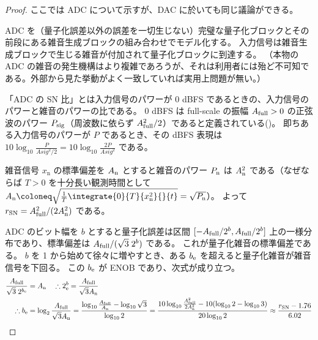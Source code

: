         \begin{proof}
            \quad\par
            ここでは ADC について示すが、DAC に於いても同じ議論ができる。\par
            ADC を（量子化誤差以外の誤差を一切生じない）完璧な量子化ブロックとその前段にある雑音生成ブロックの組み合わせでモデル化する。
            入力信号は雑音生成ブロックで生じる雑音が付加されて量子化ブロックに到達する。
            （本物の ADC の雑音の発生機構はより複雑であろうが、それは利用者には殆ど不可知である。外部から見た挙動がよく一致していれば実用上問題が無い。）
            \par
            「ADC の SN 比」とは入力信号のパワーが 0 dBFS であるときの、入力信号のパワーと雑音のパワーの比である。
            0 dBFS は full-scale の振幅 $A_\text{full}>0$ の正弦波のパワー $P_\text{sig}$（周波数に依らず $A_\text{full}^2/2$）であると定義されている(\cite{dBFS})。
            即ちある入力信号のパワーが $P$ であるとき、その dBFS 表現は $10\log_{10} \frac{P}{Asig^2/2} = 10\log_{10} \frac{2P}{Asig^2}$ である。
            \par
            雑音信号 $x_\text{n}$ の標準偏差を $A_\text{n}$ とすると雑音のパワー $P_\text{n}$ は $A_\text{n}^2$ である（なぜならば $T>0$ を十分長い観測時間として $\An\coloneq\sqrt{\frac{1}{T}\integrate{0}{T}{x_\text{n}^2}{}{t}} = \sqrt{\Pn}$）。
            よって $r_\text{SN} = A_\text{full}^2/(2A_\text{n}^2)$ である。
            \par
            ADC のビット幅を $b$ とすると量子化誤差は区間 $[-A_\text{full}/2^b,A_\text{full}/2^b]$ 上の一様分布であり、標準偏差は $A_\text{full}/(\sqrt{3}\;2^b)$ である。
            これが量子化雑音の標準偏差である。
            $b$ を 1 から始めて徐々に増やすとき、ある $b_\text{e}$ を超えると量子化雑音が雑音信号を下回る。
            この $b_\text{e}$ が ENOB であり、次式が成り立つ。
            \begin{align*}
                \frac{A_\text{full}}{\sqrt{3}\;2^{b_\text{e}}} &= A_\text{n} \quad \therefore 2^b_\text{e} = \frac{A_\text{full}}{\sqrt{3}A_\text{n}} \\
                \therefore b_\text{e} &= \log_2 \frac{A_\text{full}}{\sqrt{3}A_\text{n}} = \frac{\log_{10}\frac{A_\text{full}}{A_\text{n}} - \log_{10}\sqrt{3}}{\log_{10} 2} = \frac{10\log_{10}\frac{A_\text{full}^2}{2A_\text{n}^2} - 10(\log_{10}2 - \log_{10}3)}{20\log_{10} 2} \approx \frac{r_\text{SN} - 1.76}{6.02}
            \end{align*}
        \end{proof}